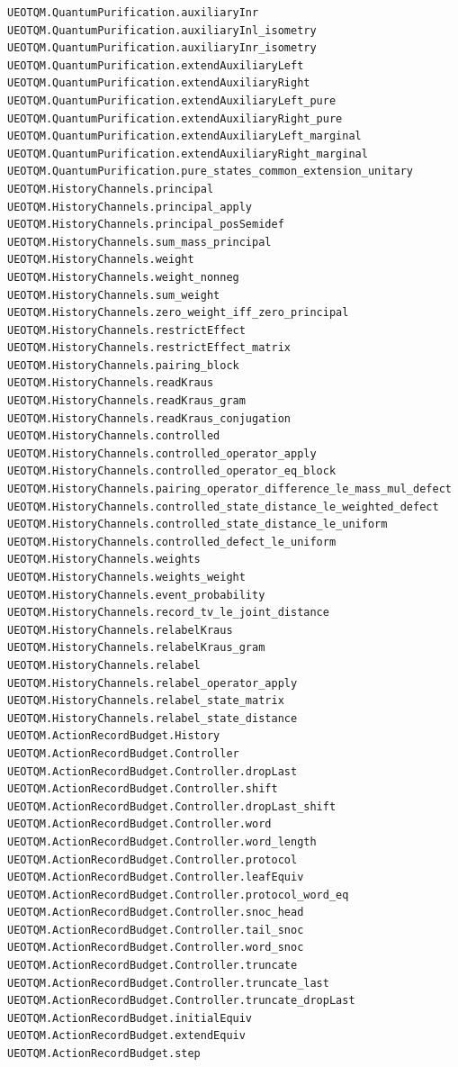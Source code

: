 \documentclass[
  11pt,
  oneside]{book}
\begin{document}
\begin{Verbatim}[breaklines,breakanywhere,fontsize=\scriptsize]
UEOTQM.QuantumPurification.auxiliaryInr
UEOTQM.QuantumPurification.auxiliaryInl_isometry
UEOTQM.QuantumPurification.auxiliaryInr_isometry
UEOTQM.QuantumPurification.extendAuxiliaryLeft
UEOTQM.QuantumPurification.extendAuxiliaryRight
UEOTQM.QuantumPurification.extendAuxiliaryLeft_pure
UEOTQM.QuantumPurification.extendAuxiliaryRight_pure
UEOTQM.QuantumPurification.extendAuxiliaryLeft_marginal
UEOTQM.QuantumPurification.extendAuxiliaryRight_marginal
UEOTQM.QuantumPurification.pure_states_common_extension_unitary
UEOTQM.HistoryChannels.principal
UEOTQM.HistoryChannels.principal_apply
UEOTQM.HistoryChannels.principal_posSemidef
UEOTQM.HistoryChannels.sum_mass_principal
UEOTQM.HistoryChannels.weight
UEOTQM.HistoryChannels.weight_nonneg
UEOTQM.HistoryChannels.sum_weight
UEOTQM.HistoryChannels.zero_weight_iff_zero_principal
UEOTQM.HistoryChannels.restrictEffect
UEOTQM.HistoryChannels.restrictEffect_matrix
UEOTQM.HistoryChannels.pairing_block
UEOTQM.HistoryChannels.readKraus
UEOTQM.HistoryChannels.readKraus_gram
UEOTQM.HistoryChannels.readKraus_conjugation
UEOTQM.HistoryChannels.controlled
UEOTQM.HistoryChannels.controlled_operator_apply
UEOTQM.HistoryChannels.controlled_operator_eq_block
UEOTQM.HistoryChannels.pairing_operator_difference_le_mass_mul_defect
UEOTQM.HistoryChannels.controlled_state_distance_le_weighted_defect
UEOTQM.HistoryChannels.controlled_state_distance_le_uniform
UEOTQM.HistoryChannels.controlled_defect_le_uniform
UEOTQM.HistoryChannels.weights
UEOTQM.HistoryChannels.weights_weight
UEOTQM.HistoryChannels.event_probability
UEOTQM.HistoryChannels.record_tv_le_joint_distance
UEOTQM.HistoryChannels.relabelKraus
UEOTQM.HistoryChannels.relabelKraus_gram
UEOTQM.HistoryChannels.relabel
UEOTQM.HistoryChannels.relabel_operator_apply
UEOTQM.HistoryChannels.relabel_state_matrix
UEOTQM.HistoryChannels.relabel_state_distance
UEOTQM.ActionRecordBudget.History
UEOTQM.ActionRecordBudget.Controller
UEOTQM.ActionRecordBudget.Controller.dropLast
UEOTQM.ActionRecordBudget.Controller.shift
UEOTQM.ActionRecordBudget.Controller.dropLast_shift
UEOTQM.ActionRecordBudget.Controller.word
UEOTQM.ActionRecordBudget.Controller.word_length
UEOTQM.ActionRecordBudget.Controller.protocol
UEOTQM.ActionRecordBudget.Controller.leafEquiv
UEOTQM.ActionRecordBudget.Controller.protocol_word_eq
UEOTQM.ActionRecordBudget.Controller.snoc_head
UEOTQM.ActionRecordBudget.Controller.tail_snoc
UEOTQM.ActionRecordBudget.Controller.word_snoc
UEOTQM.ActionRecordBudget.Controller.truncate
UEOTQM.ActionRecordBudget.Controller.truncate_last
UEOTQM.ActionRecordBudget.Controller.truncate_dropLast
UEOTQM.ActionRecordBudget.initialEquiv
UEOTQM.ActionRecordBudget.extendEquiv
UEOTQM.ActionRecordBudget.step
\end{Verbatim}
\end{document}
